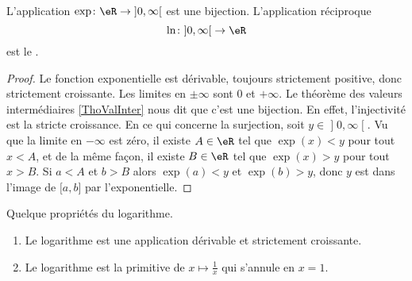 \begin{propositionDef}    \label{DEFooELGOooGiZQjt}
            L'application \(\exp\colon \eR\to \mathopen] 0 , \infty \mathclose[\) est une bijection.  L'application réciproque
            \begin{equation}
                \ln\colon \mathopen] 0 , \infty \mathclose[\to \eR
            \end{equation}
            est le .
\end{propositionDef}

\begin{proof}
Le fonction exponentielle est dérivable, toujours strictement positive, donc strictement croissante. Les limites en \( \pm \infty\) sont \( 0\) et \( +\infty\). Le théorème des valeurs intermédiaires \ref{ThoValInter} nous dit que c'est une bijection. En effet, l'injectivité est la stricte croissance. En ce qui concerne la surjection, soit \( y\in \mathopen] 0 , \infty \mathclose[\). Vu que la limite en \( -\infty\) est zéro, il existe \( A\in \eR\) tel que \( \exp(x)<y\) pour tout \( x<A\), et de la même façon, il existe \( B\in \eR\) tel que \( \exp(x)>y\) pour tout \( x>B\). Si \( a<A\) et \( b>B\) alors \( \exp(a)<y\) et \( \exp(b)>y\), donc \( y\) est dans l'image de \( \mathopen[ a , b \mathclose]\) par l'exponentielle.
\end{proof}

\begin{proposition}\label{ExZLMooMzYqfK}
    Quelque propriétés du logarithme.
    \begin{enumerate}
        \item
            Le logarithme est une application dérivable et strictement croissante.
        \item
            Le logarithme est la primitive de \( x\mapsto\frac{1}{ x }\) qui s'annule en \( x=1\).
    \end{enumerate}
\end{proposition}

